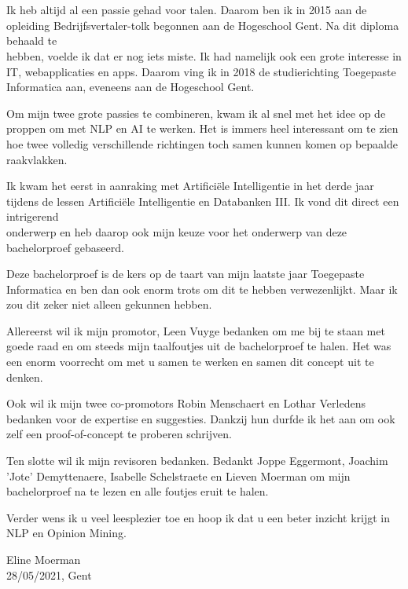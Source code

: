 
\chapter*{}
\label{ch:voorwoord}

Ik heb altijd al een passie gehad voor talen. Daarom ben ik in 2015 aan de opleiding Bedrijfsvertaler-tolk begonnen aan de Hogeschool Gent. Na dit diploma behaald te \\hebben, voelde ik dat er nog iets miste. Ik had namelijk ook een grote interesse in IT, webapplicaties en apps. Daarom ving ik in 2018 de studierichting Toegepaste Informatica aan, eveneens aan de Hogeschool Gent.

Om mijn twee grote passies te combineren, kwam ik al snel met het idee op de proppen om met NLP en AI te werken. Het is immers heel interessant om te zien hoe twee volledig verschillende richtingen toch samen kunnen komen op bepaalde raakvlakken.

Ik kwam het eerst in aanraking met Artificiële Intelligentie in het derde jaar tijdens de lessen Artificiële Intelligentie en Databanken III. Ik vond dit direct een intrigerend \\onderwerp en heb daarop ook mijn keuze voor het onderwerp van deze bachelorproef gebaseerd. 

Deze bachelorproef is de kers op de taart van mijn laatste jaar Toegepaste Informatica en ben dan ook enorm trots om dit te hebben verwezenlijkt. Maar ik zou dit zeker niet alleen gekunnen hebben.

Allereerst wil ik mijn promotor, Leen Vuyge bedanken om me bij te staan met goede raad en om steeds mijn taalfoutjes uit de bachelorproef te halen. Het was een enorm voorrecht om met u samen te werken en samen dit concept uit te denken.

Ook wil ik mijn twee co-promotors Robin Menschaert en Lothar Verledens bedanken voor de expertise en suggesties. Dankzij hun durfde ik het aan om ook zelf een proof-of-concept te proberen schrijven.

Ten slotte wil ik mijn revisoren bedanken. Bedankt Joppe Eggermont, Joachim 'Jote' Demyttenaere, Isabelle Schelstraete en Lieven Moerman om mijn bachelorproef na te lezen en alle foutjes eruit te halen.

Verder wens ik u veel leesplezier toe en hoop ik dat u een beter inzicht krijgt in NLP en Opinion Mining.

Eline Moerman \\
28/05/2021, Gent
